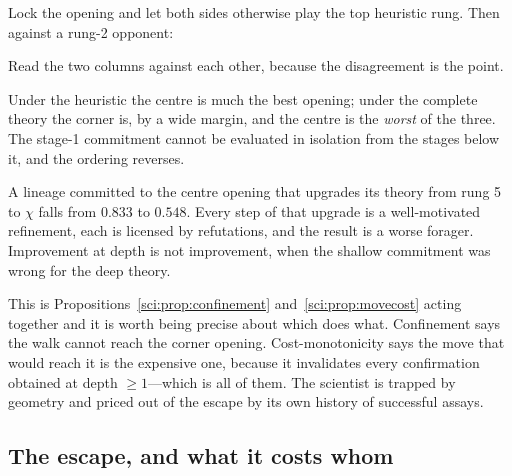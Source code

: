 Lock the opening and let both sides otherwise play the top heuristic rung. Then
against a rung-2 opponent:

\begin{center}
\end{center}

Read the two columns against each other, because the disagreement is the point.

\begin{observation}\label{gam:best-opening-property-game}
Under the heuristic the centre is much the best opening; under the complete
theory the corner is, by a wide margin, and the centre is the \emph{worst} of
the three. The stage-1 commitment cannot be evaluated in isolation from the
stages below it, and the ordering reverses.
\end{observation}

\begin{corollary}\label{gam:deepening-within-ball-can}
A lineage committed to the centre opening that upgrades its theory from rung 5
to $\chi$ falls from $0.833$ to $0.548$. Every step of that upgrade is a
well-motivated refinement, each is licensed by refutations, and the result is a
worse forager. Improvement at depth is not improvement, when the shallow
commitment was wrong for the deep theory.
\end{corollary}

This is Propositions~\ref{sci:prop:confinement} and~\ref{sci:prop:movecost} acting together and it is worth being
precise about which does what. Confinement says the walk cannot reach the corner
opening. Cost-monotonicity says the move that would reach it is the expensive
one, because it invalidates every confirmation obtained at depth $\ge 1$---which
is all of them. The scientist is trapped by geometry and priced out of the
escape by its own history of successful assays.

\subsection{The escape, and what it costs whom}\label{gam:S9.3}

